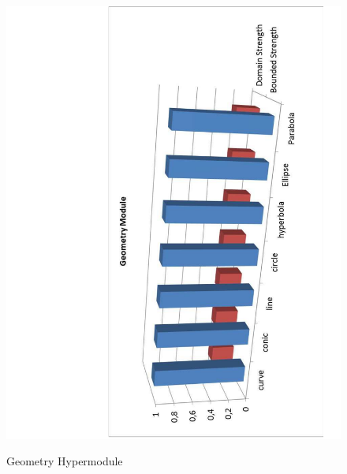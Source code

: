 \begin{figure}
	\centering
	\scriptsize
	\begin{minipage}{.5\textwidth}
		\includegraphics[scale=0.35, angle=-90]{figure-chapterIV/fig4-26}\\
		\caption{Geometry Hypermodule}
		\label{figure4-26}
	\end{minipage}%
	\begin{minipage}{.5\textwidth}

\end{minipage}
\end{figure}
